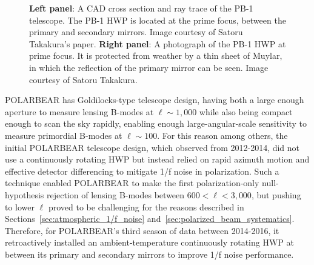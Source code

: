 \begin{figure}
    \centering
    \caption{\textbf{Left panel}: A CAD cross section and ray trace of the PB-1 telescope. The PB-1 HWP is located at the prime focus, between the primary and secondary mirrors. Image courtesy of Satoru Takakura's paper. \textbf{Right panel}: A photograph of the PB-1 HWP at prime focus. It is protected from weather by a thin sheet of Muylar, in which the reflection of the primary mirror can be seen. Image courtesy of Satoru Takakura.}
    \label{fig:pb1_telescope_hwp}
\end{figure}

POLARBEAR has Goldilocks-type telescope design, having both a large enough aperture to measure lensing B-modes at $\ell \sim 1,000$ while also being compact enough to scan the sky rapidly, enabling enough large-angular-scale sensitivity to measure primordial B-modes at $\ell \sim 100$. For this reason among others, the initial POLARBEAR telescope design, which observed from 2012-2014, did not use a continuously rotating HWP but instead relied on rapid azimuth motion and effective detector differencing to mitigate 1/f noise in polarization. Such a technique enabled POLARBEAR to make the first polarization-only null-hypothesis rejection of lensing B-modes between $600 < \ell < 3,000$, but pushing to lower $\ell$ proved to be challenging for the reasons described in Sections~\ref{sec:atmospheric_1/f_noise} and~\ref{sec:polarized_beam_systematics}. Therefore, for POLARBEAR's third season of data between 2014-2016, it retroactively installed an ambient-temperature continuously rotating HWP at  between its primary and secondary mirrors to improve 1/f noise performance.

